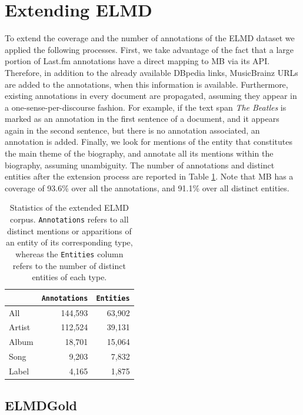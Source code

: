 \section{Extending ELMD}
\label{sec:linking:extending}

To extend the coverage and the number of annotations of the \textsc{ELMD} dataset we applied the following processes. First, we take advantage of the fact that a large portion of Last.fm annotations have a direct mapping to MB via its API. Therefore, in addition to the already available DBpedia links, MusicBrainz URLs are added to the annotations, when this information is available. Furthermore, existing annotations in every document are propagated, assuming they appear in a one-sense-per-discourse fashion. For example, if the text span \textit{The Beatles} is marked as an annotation in the first sentence of a document, and it appears again in the second sentence, but there is no annotation associated, an annotation is added. Finally, we look for mentions of the entity that constitutes the main theme of the biography, and annotate all its mentions within the biography, assuming unambiguity. The number of annotations and distinct entities after the extension process are reported in Table \ref{tbl:linking:elmd2}. Note that MB has a coverage of 93.6\% over all the annotations, and 91.1\% over all distinct entities.

\begin{table}[]
\def\arraystretch{1.25}
\centering
\begin{tabular}{lrr}
       & \texttt{Annotations} & \texttt{Entities} \\ \hline \hline
All    & 144,593      & 63,902    \\ \hline
Artist & 112,524      & 39,131    \\ \hline
Album  & 18,701       & 15,064    \\ \hline
Song  & 9,203        & 7,832     \\ \hline
Label  & 4,165        & 1,875    
\\ \hline
\end{tabular}
\caption{Statistics of the extended ELMD corpus. \texttt{Annotations} refers to all distinct mentions or apparitions of an entity of its corresponding type, whereas the \texttt{Entities} column refers to the number of distinct entities of each type.}
\label{tbl:linking:elmd2}
\end{table}


\subsection{ELMDGold}
\label{sec:linking:gold}

